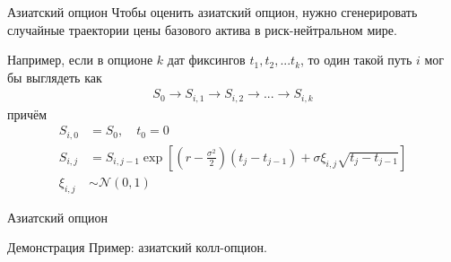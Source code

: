\documentclass{beamer}
\begin{document}
\begin{frame}{Азиатский опцион}
\justify
Чтобы оценить азиатский опцион, нужно сгенерировать случайные траектории цены базового актива в риск-нейтральном мире.

\justify
Например, если в опционе $k$ дат фиксингов $t_1, t_2, ... t_k$, то один такой путь $i$ мог бы выглядеть как 
\begin{align*}
S_0 \to S_{i,1} \to S_{i,2} \to ... \to S_{i,k}
\end{align*}
причём
\begin{align*}
S_{i,0} &= S_0, \quad t_0 = 0 \\
S_{i,j} &= S_{i,j-1} \exp\left[\left(r - \frac{\sigma^2}{2}\right)(t_j - t_{j-1}) + \sigma\xi_{i,j}\sqrt{t_j - t_{j-1}}\right] \\
\xi_{i,j} &\sim \mathcal{N}(0, 1)
\end{align*}
\end{frame}



\newcommand{\plotStockPath}[2] {
	
	\addplot[
		mark = *,
		color = #2,
		thick
	]
	table[
		x = t,
		y = stock_price,
		col sep = comma,
		discard if not={path}{#1}
	]
	{monte_carlo_paths.csv};
}

\begin{frame}{Азиатский опцион}
\centering
{}
\end{frame}



\begin{frame}{Демонстрация}
\justify
Пример: азиатский колл-опцион.
\end{frame}
\end{document}
